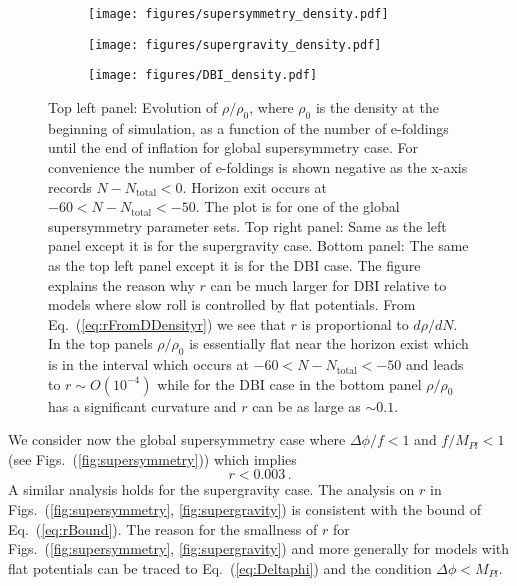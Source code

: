 \documentclass[12pt]{article}
\begin{document}
\begin{figure}
  \centering
  \begin{subfigure}{0.45 \textwidth}
    \texttt{[image: figures/supersymmetry\_density.pdf]}
  \end{subfigure}
  \begin{subfigure}{0.45 \textwidth}
    \texttt{[image: figures/supergravity\_density.pdf]}
  \end{subfigure}
  \begin{subfigure}{0.45 \textwidth}
    \texttt{[image: figures/DBI\_density.pdf]}
  \end{subfigure}
  \caption{
    Top left panel: Evolution of $\rho / \rho_0$, where $\rho_0$ is the density at the beginning of simulation, as a function of the number of e-foldings until the end of inflation for global supersymmetry case.
    For convenience the number of e-foldings is shown negative as the x-axis records $N - N_\text{total} < 0$.
    Horizon exit occurs at $-60 < N - N_\text{total} < -50$.
    The plot is for one of the global supersymmetry parameter sets.
    Top right panel: Same as the left panel except it is for the supergravity case.
    Bottom panel: The same as the top left panel except it is for the DBI case.
    The figure explains the reason why $r$ can be much larger for DBI relative to models where slow roll is controlled by flat potentials.
    From Eq.~(\ref{eq:rFromDDensityr}) we see that $r$ is proportional to $d\rho / dN$.
    In the top panels $\rho / \rho_0$ is essentially flat near the horizon exist which is in the interval which occurs at $-60 < N - N_\text{total} < -50$ and leads to $r \sim O\left(10^{-4}\right)$ while for the DBI case in the bottom panel $\rho / \rho_0$ has a significant curvature and $r$ can be as large as $\sim 0.1$.
  } \label{fig:density}
\end{figure}
We consider now the global supersymmetry case where $\Delta\phi / f < 1$ and $f / M_{Pl} < 1$ (see Figs.~(\ref{fig:supersymmetry})) which implies
\begin{equation} \label{eq:rBound}
  r < 0.003\,.
\end{equation}
A similar analysis holds for the supergravity case.
The analysis on $r$ in Figs.~(\ref{fig:supersymmetry}, \ref{fig:supergravity}) is consistent with the bound of Eq.~(\ref{eq:rBound}).
The reason for the smallness of $r$ for Figs.~(\ref{fig:supersymmetry}, \ref{fig:supergravity}) and more generally for models with flat potentials can be traced to Eq.~(\ref{eq:Deltaphi}) and the condition $\Delta\phi < M_{Pl}$.
\end{document}
